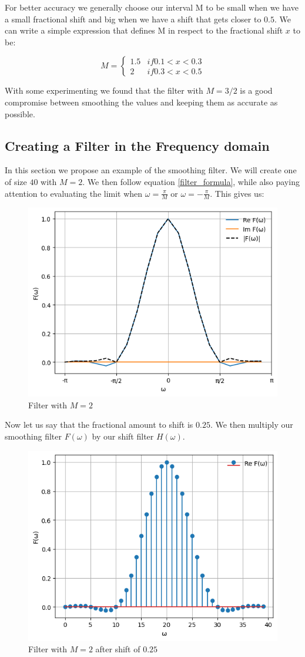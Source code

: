 \documentclass[]{usiinfbachelorproject}
\begin{document}
	For better accuracy we generally choose our interval M to be small when we have a small fractional shift and big when we have a shift that gets closer to $0.5$. We can write a simple expression that defines M in respect to the fractional shift $x$ to be:
	
	
	\begin{equation*}
		M = 
		\begin{cases}
			1.5 & if 0.1 < x < 0.3\\
			2 & if 0.3 < x < 0.5
		\end{cases}
	\end{equation*}
	
	With some experimenting we found that the filter with $M=3/2$ is a good compromise between smoothing the values and keeping them as accurate as possible.
	
	\subsection{Creating a Filter in the Frequency domain}
	In this section we propose an example of the smoothing filter.
	We will create one of size $40$ with $M=2$. We then follow equation \ref{filter_formula}, while also paying attention to evaluating the limit when $\omega=\frac{\pi}{M}$ or $\omega=-\frac{\pi}{M}$. This gives us:
	\begin{figure}[h]
		\centering
		\includegraphics[width=0.4\columnwidth]{images/filter_m_2.png}
		\caption{Filter with $M=2$}
		\label{original_filter}
	\end{figure}
	
	Now let us say that the fractional amount to shift is $0.25$. We then multiply our smoothing filter $F(\omega)$ by our shift filter $H(\omega)$.
	\begin{figure}[h]
		\centering
		\includegraphics[width=0.4\columnwidth]{images/filter_m_2_25_shift.png}
		\caption{Filter with $M=2$ after shift of $0.25$}
		\label{shifted_filter}
	\end{figure}
	
\end{document}
